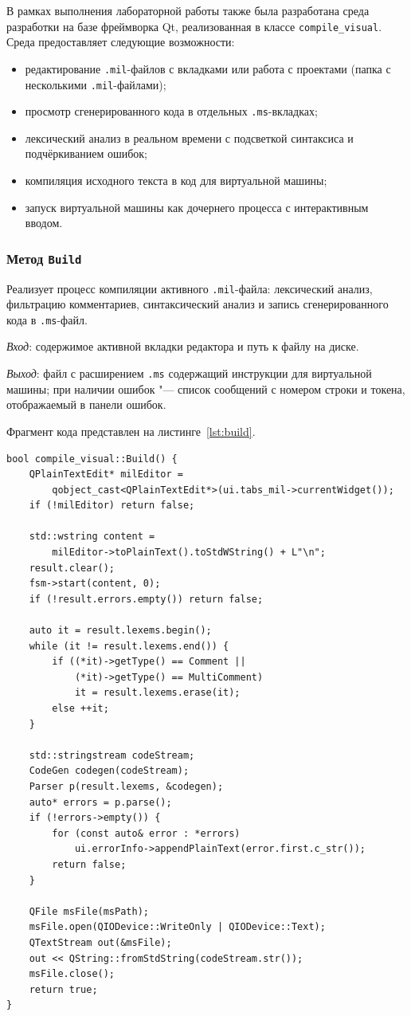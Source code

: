 \documentclass[a4paper,final]{article}
\begin{document}
В рамках выполнения лабораторной работы также была разработана среда разработки на базе фреймворка Qt, реализованная в классе \texttt{compile\_visual}. Среда
предоставляет следующие возможности:
\begin{itemize}
  \item редактирование \texttt{.mil}-файлов с вкладками или работа с проектами (папка с несколькими \texttt{.mil}-файлами);
  \item просмотр сгенерированного кода в отдельных \texttt{.ms}-вкладках;
  \item лексический анализ в реальном времени с подсветкой синтаксиса и
        подчёркиванием ошибок;
  \item компиляция исходного текста в код для виртуальной машины;
  \item запуск виртуальной машины как дочернего процесса с интерактивным вводом.
\end{itemize}

\subsubsection*{Метод \texttt{Build}}

Реализует процесс компиляции активного \texttt{.mil}-файла:
лексический анализ, фильтрацию комментариев, синтаксический анализ и
запись сгенерированного кода в \texttt{.ms}-файл.

\textit{Вход}: содержимое активной вкладки редактора и путь к файлу на диске.

\textit{Выход}: файл с расширением \texttt{.ms} содержащий инструкции для виртуальной машины;
при наличии ошибок "--- список сообщений с номером строки и токена,
отображаемый в панели ошибок.

Фрагмент кода представлен на листинге~\ref{lst:build}.

\begin{lstlisting}[caption={Метод compile\_visual::Build (фрагмент)}, label=lst:build]
bool compile_visual::Build() {
    QPlainTextEdit* milEditor =
        qobject_cast<QPlainTextEdit*>(ui.tabs_mil->currentWidget());
    if (!milEditor) return false;

    std::wstring content =
        milEditor->toPlainText().toStdWString() + L"\n";
    result.clear();
    fsm->start(content, 0);
    if (!result.errors.empty()) return false;

    auto it = result.lexems.begin();
    while (it != result.lexems.end()) {
        if ((*it)->getType() == Comment ||
            (*it)->getType() == MultiComment)
            it = result.lexems.erase(it);
        else ++it;
    }

    std::stringstream codeStream;
    CodeGen codegen(codeStream);
    Parser p(result.lexems, &codegen);
    auto* errors = p.parse();
    if (!errors->empty()) {
        for (const auto& error : *errors)
            ui.errorInfo->appendPlainText(error.first.c_str());
        return false;
    }

    QFile msFile(msPath);
    msFile.open(QIODevice::WriteOnly | QIODevice::Text);
    QTextStream out(&msFile);
    out << QString::fromStdString(codeStream.str());
    msFile.close();
    return true;
}
\end{lstlisting}
\end{document}
